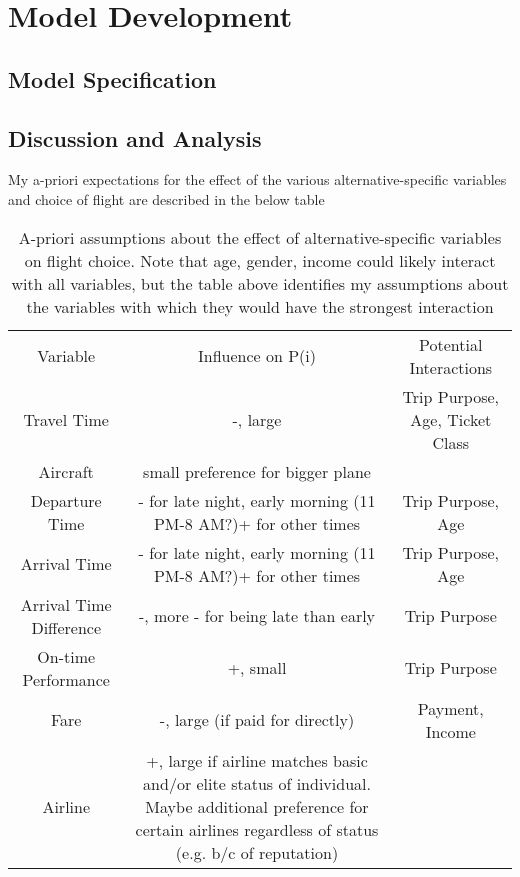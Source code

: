 \section{Model Development}
\subsection{Model Specification}
\subsection{Discussion and Analysis}
My a-priori expectations for the effect of the various alternative-specific variables and choice of flight are described in the below table
\begin{table} 
    \begin{tabular}{ c c c }
        Variable & Influence on P(i) & Potential Interactions \\ 
        Travel Time & -, large & Trip Purpose, Age, Ticket Class \\ 
        Aircraft & small preference for bigger plane &  \\ 
        Departure Time & - for late night, early morning (11 PM-8 AM?)+ for other times & Trip Purpose, Age \\ 
        Arrival Time & - for late night, early morning (11 PM-8 AM?)+ for other times & Trip Purpose, Age \\ 
        Arrival Time Difference & -, more - for being late than early & Trip Purpose \\ 
        On-time Performance & +, small & Trip Purpose \\ 
        Fare & -, large (if paid for directly) & Payment, Income \\ 
        Airline & +, large if airline matches basic and/or elite status of individual. Maybe additional preference for certain airlines regardless of status (e.g. b/c of reputation) &  \\ 
    \end{tabular} 
    \caption{A-priori assumptions about the effect of alternative-specific variables on flight choice. Note that age, gender, income could likely interact with all variables, but the table above identifies my assumptions about the variables with which they would have the strongest interaction} 
\end{table}